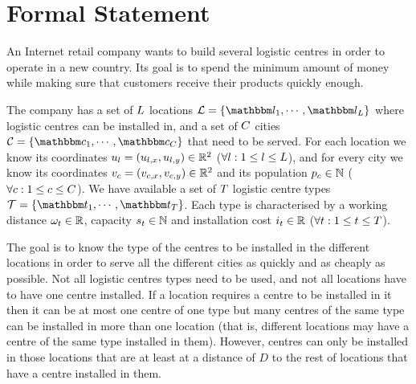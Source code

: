 \section{Formal Statement}
\label{sec:formal-statement}

An Internet retail company wants to build several logistic centres in order to operate
in a new country. Its goal is to spend the minimum amount of money while making sure that
customers receive their products quickly enough.

\hfill

The company has a set of $L$ locations $\loc = \{\eloc_1, \cdots, \eloc_\nloc\}$ where
logistic centres can be installed in, and a set of $C$ cities $\city = \{\ecity_1,
\cdots, \ecity_\ncity\}$ that need to be served. For each location we know its coordinates
$u_l = (u_{l, x}, u_{l, y}) \in \mathbb{R}^2$ ($\forall l : 1 \le l \le
L$), and for every city we know its coordinates $v_c = (v_{c, x}, v_{c, y})
\in \mathbb{R}^2$ and its population $p_c \in \mathbb{N}$ ($\forall c : 1 \le c
\le C$). We have available a set of $T$ logistic centre types $\centre =
\{\ecentre_1, \cdots, \ecentre_\ncentre\}$. Each type is characterised by a working distance
$\omega_t \in \mathbb{R}$, capacity $s_t \in \mathbb{N}$ and installation cost
$i_t \in \mathbb{R}$ ($\forall t : 1 \le t \le T$).

\hfill

The goal is to know the type of the centres to be installed in the different locations in
order to serve all the different cities as quickly and as cheaply as possible. Not all logistic
centres types need to be used, and not all locations have to have one centre installed. If a
location requires a centre to be installed in it then it can be at most one centre of one type
but many centres of the same type can be installed in more than one location (that is,
different locations may have a centre of the same type installed in them). However, centres can
only be installed in those locations that are at least at a distance of $D$ to the rest of
locations that have a centre installed in them.

\hfill

